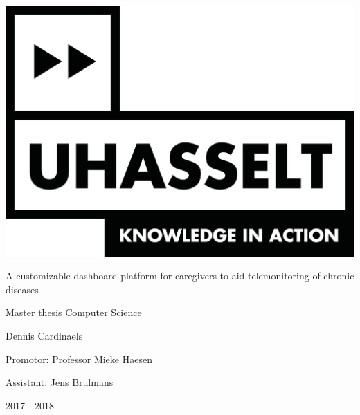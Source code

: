 
\begin{titlepage}
    \centering
    
    
    \includegraphics[scale=0.5]{chapters/title_page/logo_uhasselt}		
    \vspace{1cm}
    
    \Huge A customizable dashboard platform for caregivers to aid telemonitoring of chronic diseases
    \vspace{0.4cm}
    
    \large Master thesis Computer Science
    \vspace{1cm}
    
    \LARGE Dennis Cardinaels
    \vspace{1cm}
    
    \large Promotor: Professor Mieke Haesen
    \vspace{0.2cm}
    
    Assistant: Jens Brulmans
    
    \vspace{1.2cm}
    
    
    \Large 2017 - 2018
    
\end{titlepage}